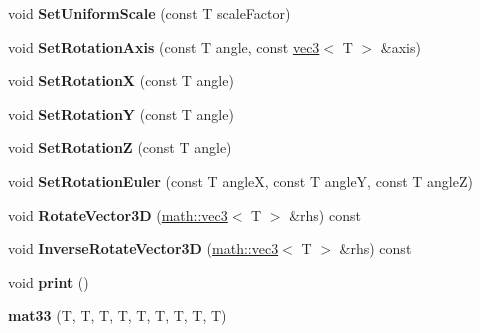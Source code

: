 \begin{DoxyCompactItemize}
\item 
\hypertarget{classmath_1_1mat33_a3c11604597c76d78840aa36a72db3ffe}{
void {\bfseries SetUniformScale} (const T scaleFactor)}
\label{classmath_1_1mat33_a3c11604597c76d78840aa36a72db3ffe}

\item 
\hypertarget{classmath_1_1mat33_a8e3436cfb380ebf5a5bab4c716fd09d4}{
void {\bfseries SetRotationAxis} (const T angle, const \hyperlink{classmath_1_1vec3}{vec3}$<$ T $>$ \&axis)}
\label{classmath_1_1mat33_a8e3436cfb380ebf5a5bab4c716fd09d4}

\item 
\hypertarget{classmath_1_1mat33_ac85087803d562d566c0fd223fd4dcefc}{
void {\bfseries SetRotationX} (const T angle)}
\label{classmath_1_1mat33_ac85087803d562d566c0fd223fd4dcefc}

\item 
\hypertarget{classmath_1_1mat33_a1256da6ae3e29025fb05d1178026b2b3}{
void {\bfseries SetRotationY} (const T angle)}
\label{classmath_1_1mat33_a1256da6ae3e29025fb05d1178026b2b3}

\item 
\hypertarget{classmath_1_1mat33_a89da4d2ddbe2c09a2d7b71a6be104d52}{
void {\bfseries SetRotationZ} (const T angle)}
\label{classmath_1_1mat33_a89da4d2ddbe2c09a2d7b71a6be104d52}

\item 
\hypertarget{classmath_1_1mat33_a4aba4c80be0d58634de824e2f92bdbe7}{
void {\bfseries SetRotationEuler} (const T angleX, const T angleY, const T angleZ)}
\label{classmath_1_1mat33_a4aba4c80be0d58634de824e2f92bdbe7}

\item 
\hypertarget{classmath_1_1mat33_a2e702a6ba47193f532f0fa9605617ff7}{
void {\bfseries RotateVector3D} (\hyperlink{classmath_1_1vec3}{math::vec3}$<$ T $>$ \&rhs) const }
\label{classmath_1_1mat33_a2e702a6ba47193f532f0fa9605617ff7}

\item 
\hypertarget{classmath_1_1mat33_ab2572c609a3da7b07288e46152c80591}{
void {\bfseries InverseRotateVector3D} (\hyperlink{classmath_1_1vec3}{math::vec3}$<$ T $>$ \&rhs) const }
\label{classmath_1_1mat33_ab2572c609a3da7b07288e46152c80591}

\item 
\hypertarget{classmath_1_1mat33_ade4559e0eb4c2010c684a696ef505996}{
void {\bfseries print} ()}
\label{classmath_1_1mat33_ade4559e0eb4c2010c684a696ef505996}

\item 
\hypertarget{classmath_1_1mat33_a30361eb215e6d73fcb223996a6883944}{
{\bfseries mat33} (T, T, T, T, T, T, T, T, T)}
\label{classmath_1_1mat33_a30361eb215e6d73fcb223996a6883944}


\end{DoxyCompactItemize}
